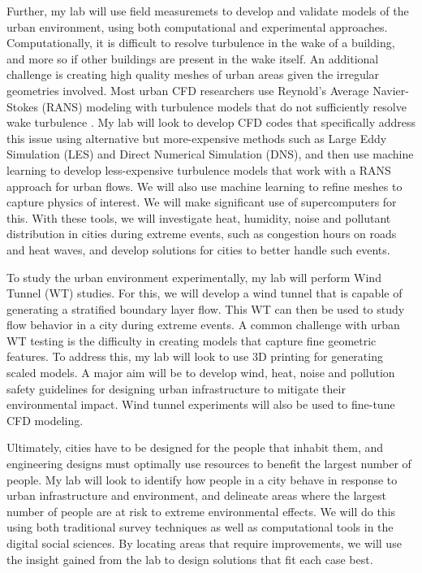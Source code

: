 \documentclass[12pt]{article}
\begin{document}
Further, my lab will use field measuremets to develop and validate models of the urban environment, using both computational and experimental approaches. Computationally, it is difficult to resolve turbulence in the wake of a building, and more so if other buildings are present in the wake itself. An additional challenge is creating high quality meshes of urban areas given the irregular geometries involved. Most urban CFD researchers use Reynold's Average Navier-Stokes (RANS) modeling with turbulence models that do not sufficiently resolve wake turbulence \cite{blocken2015computational}. My lab will look to develop CFD codes that specifically address this issue using alternative but more-expensive methods such as Large Eddy Simulation (LES) and Direct Numerical Simulation (DNS), and then use machine learning to develop less-expensive turbulence models that work with a RANS approach for urban flows. We will also use machine learning to refine meshes to capture physics of interest. We will make significant use of supercomputers for this. With these tools, we will investigate heat, humidity, noise and pollutant distribution in cities during extreme events, such as congestion hours on roads and heat waves, and develop solutions for cities to better handle such events.

To study the urban environment experimentally, my lab will perform Wind Tunnel (WT) studies. For this, we will develop a wind tunnel that is capable of generating a stratified boundary layer flow. This WT can then be used to study flow behavior in a city during extreme events. A common challenge with urban WT testing is the difficulty in creating models that capture fine geometric features. To address this, my lab will look to use 3D printing for generating scaled models. A major aim will be to develop wind, heat, noise and pollution safety guidelines for designing urban infrastructure to mitigate their environmental impact. Wind tunnel experiments will also be used to fine-tune CFD modeling. 

Ultimately, cities have to be designed for the people that inhabit them, and engineering designs must optimally use resources to benefit the largest number of people. My lab will look to identify how people in a city behave in response to urban infrastructure and environment, and delineate areas where the largest number of people are at risk to extreme environmental effects. We will do this using both traditional survey techniques as well as computational tools in the digital social sciences. By locating areas that require improvements, we will use the insight gained from the lab to design solutions that fit each case best. 
\end{document}
